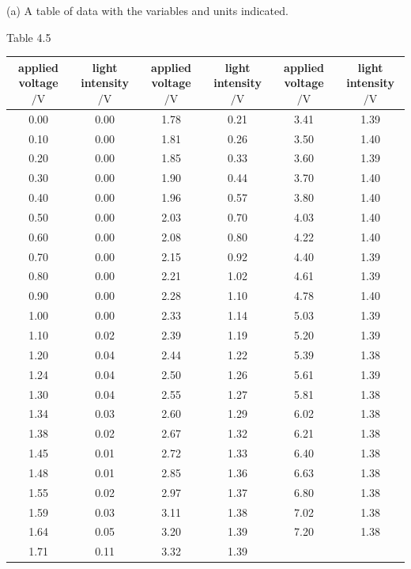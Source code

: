 (a) A table of data with the variables and units indicated.

\begin{center}
{\small Table 4.5}\\[3pt]
{\footnotesize
\renewcommand{\arraystretch}{1.08}
\begin{tabular}{|c|c||c|c||c|c|}
\hline
\shortstack{applied\\[-2pt]voltage$/\mathrm{V}$} & \shortstack{light\\[-2pt]intensity$/\mathrm{V}$} & \shortstack{applied\\[-2pt]voltage$/\mathrm{V}$} & \shortstack{light\\[-2pt]intensity$/\mathrm{V}$} & \shortstack{applied\\[-2pt]voltage$/\mathrm{V}$} & \shortstack{light\\[-2pt]intensity$/\mathrm{V}$}\\
\hline
0.00 & 0.00 & 1.78 & 0.21 & 3.41 & 1.39\\
\hline
0.10 & 0.00 & 1.81 & 0.26 & 3.50 & 1.40\\
\hline
0.20 & 0.00 & 1.85 & 0.33 & 3.60 & 1.39\\
\hline
0.30 & 0.00 & 1.90 & 0.44 & 3.70 & 1.40\\
\hline
0.40 & 0.00 & 1.96 & 0.57 & 3.80 & 1.40\\
\hline
0.50 & 0.00 & 2.03 & 0.70 & 4.03 & 1.40\\
\hline
0.60 & 0.00 & 2.08 & 0.80 & 4.22 & 1.40\\
\hline
0.70 & 0.00 & 2.15 & 0.92 & 4.40 & 1.39\\
\hline
0.80 & 0.00 & 2.21 & 1.02 & 4.61 & 1.39\\
\hline
0.90 & 0.00 & 2.28 & 1.10 & 4.78 & 1.40\\
\hline
1.00 & 0.00 & 2.33 & 1.14 & 5.03 & 1.39\\
\hline
1.10 & 0.02 & 2.39 & 1.19 & 5.20 & 1.39\\
\hline
1.20 & 0.04 & 2.44 & 1.22 & 5.39 & 1.38\\
\hline
1.24 & 0.04 & 2.50 & 1.26 & 5.61 & 1.39\\
\hline
1.30 & 0.04 & 2.55 & 1.27 & 5.81 & 1.38\\
\hline
1.34 & 0.03 & 2.60 & 1.29 & 6.02 & 1.38\\
\hline
1.38 & 0.02 & 2.67 & 1.32 & 6.21 & 1.38\\
\hline
1.45 & 0.01 & 2.72 & 1.33 & 6.40 & 1.38\\
\hline
1.48 & 0.01 & 2.85 & 1.36 & 6.63 & 1.38\\
\hline
1.55 & 0.02 & 2.97 & 1.37 & 6.80 & 1.38\\
\hline
1.59 & 0.03 & 3.11 & 1.38 & 7.02 & 1.38\\
\hline
1.64 & 0.05 & 3.20 & 1.39 & 7.20 & 1.38\\
\hline
1.71 & 0.11 & 3.32 & 1.39 & & \\
\hline
\end{tabular}}
\end{center}

